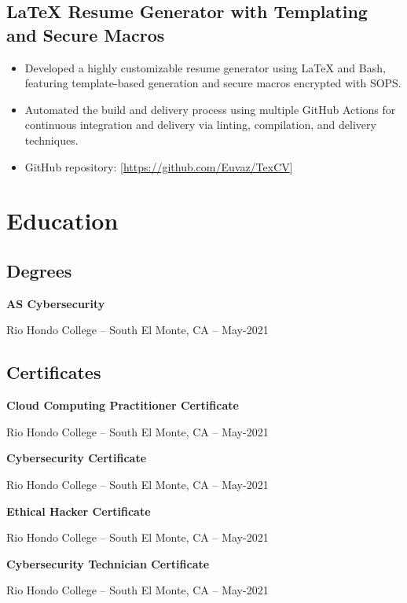 \documentclass[a4paper]{article}
\begin{document}
\subsection{LaTeX Resume Generator with Templating and Secure Macros}
\begin{itemize}
    \item Developed a highly customizable resume generator using LaTeX and Bash, featuring template-based generation and secure macros encrypted with SOPS.
    \item Automated the build and delivery process using multiple GitHub Actions for continuous integration and delivery via linting, compilation, and delivery techniques.
    \item GitHub repository: [\url{https://github.com/Euvaz/TexCV}]
\end{itemize}

\section{Education}
\subsection{Degrees}
\begin{minipage}{\textwidth}
\textbf{AS Cybersecurity}\par
Rio Hondo College -- South El Monte, CA -- May-2021
\end{minipage}

\vspace{20pt}
\subsection{Certificates}
\begin{minipage}{\textwidth}
\textbf{Cloud Computing Practitioner Certificate}\par
Rio Hondo College -- South El Monte, CA -- May-2021

\medskip
\textbf{Cybersecurity Certificate}\par
Rio Hondo College -- South El Monte, CA -- May-2021

\medskip
\textbf{Ethical Hacker Certificate}\par
Rio Hondo College -- South El Monte, CA -- May-2021

\medskip
\textbf{Cybersecurity Technician Certificate}\par
Rio Hondo College -- South El Monte, CA -- May-2021
\end{minipage}
\end{document}
